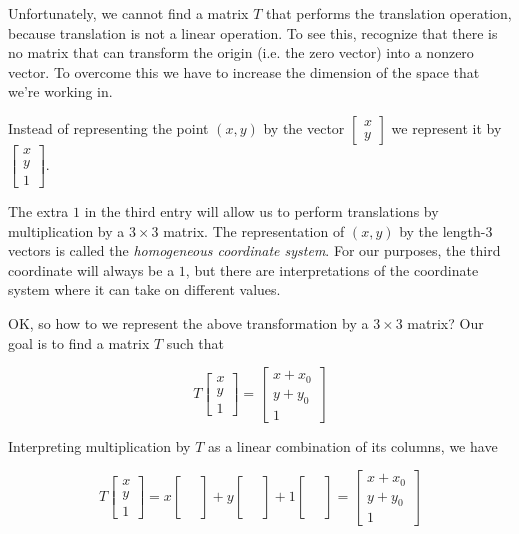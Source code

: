 \documentclass[12pt]{article}
\newcommand{\nin}{\noindent}
\newcommand{\vthree}{\vspace{3mm}}
\newcommand{\myp}[1]{\left( #1 \right)}
\newcommand{\mymat}[1]{
\left[
\begin{array}{rrrrrrrrrrrrrrrrrrrrrrrrrrrrrrrrrrrrrrr}
#1
\end{array}
\right]
}
\begin{document}
\vthree

\nin Unfortunately, we cannot find a matrix $T$ that performs the translation operation, because translation is not a linear operation.  To see this, recognize that there is no matrix that can transform the origin (i.e. the zero vector) into a nonzero vector.  To overcome this we have to increase the dimension of the space that we're working in.

\vthree

\nin Instead of representing the point $\myp{x,y}$ by the vector $\mymat{x \\ y}$ we represent it by $\mymat{x \\ y \\ 1}$.

\vthree

\nin The extra $1$ in the third entry will allow us to perform translations by multiplication by a $3 \times 3$ matrix.  The representation of $\myp{x,y}$ by the length-3 vectors is called the {\it homogeneous coordinate system}.  For our purposes, the third coordinate will always be a $1$, but there are interpretations of the coordinate system where it can take on different values.

\clearpage

\nin OK, so how to we represent the above transformation by a $3 \times 3$ matrix?  Our goal is to find a matrix $T$ such that

\[
T \mymat{x \\ y \\ 1} = \mymat{x + x_0 \\ y + y_0 \\ 1}
\]

\vthree

\nin Interpreting multiplication by $T$ as a linear combination of its columns, we have

\[
T \mymat{x \\ y \\ 1} =
x\mymat{\phantom{x} \\ \phantom{x} \\ \phantom{x}} +
y\mymat{\phantom{x} \\ \phantom{x} \\ \phantom{x}} +
1\mymat{\phantom{x} \\ \phantom{x} \\ \phantom{x}}
=
\mymat{x + x_0 \\ y + y_0 \\ 1}
\]

\vthree
\end{document}

